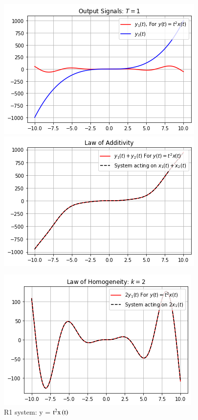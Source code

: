 \documentclass[journal,12pt,twocolumn]{IEEEtran}
\begin{document}
\begin{figure}[h]
\caption{R1 system: y = $\text{t}^2\text{x}\left(\text{t}\right)$ }
\includegraphics[width = \columnwidth]{y1}
\includegraphics[width = \columnwidth]{y1_p}

\includegraphics[width = \columnwidth]{y1_h}


\end{figure}
\end{document}
